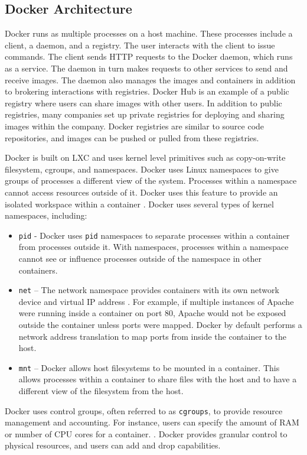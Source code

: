 \documentclass[11pt]{article}
\begin{document}
\subsection{Docker Architecture}
Docker runs as multiple processes on a host machine. These processes include a client, a daemon, and a registry. The user interacts with the client to issue commands. The client sends HTTP requests to the Docker daemon, which runs as a service. The daemon in turn makes requests to other services to send and receive images. The daemon also manages the images and containers in addition to brokering interactions with registries. Docker Hub is an example of a public registry where users can share images with other users. In addition to public registries, many companies set up private registries for deploying and sharing images within the company. Docker registries are similar to source code repositories, and images can be pushed or pulled from these registries. 

Docker is built on LXC and uses kernel level primitives such as copy-on-write filesystem, cgroups, and namespaces. Docker uses Linux namespaces to give groups of processes a different view of the system. Processes within a namespace cannot access resources outside of it. Docker uses this feature to provide an isolated workspace within a container \cite{rosen}. Docker uses several types of kernel namespaces, including:
\begin{itemize}
	\item \texttt{pid} - Docker uses \texttt{pid} namespaces to separate processes within a container from processes outside it. With namespaces, processes within a namespace cannot see or influence processes outside of the namespace in other containers. 
	\item \texttt{net} – The network namespace provides containers with its own network device and virtual IP address \cite{anderson}. For example, if multiple instances of Apache were running inside a container on port 80, Apache would not be exposed outside the container unless ports were mapped. Docker by default performs a network address translation to map ports from inside the container to the host. 
	\item \texttt{mnt} – Docker allows host filesystems to be mounted in a container. This allows processes within a container to share files with the host and to have a different view of the filesystem from the host. 
\end{itemize}

Docker uses control groups, often referred to as \texttt{cgroups}, to provide resource management and accounting. For instance, users can specify the amount of RAM or number of CPU cores for a container. \cite{anderson}. Docker provides granular control to physical resources, and users can add and drop capabilities. 
\end{document}
